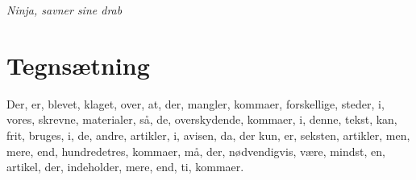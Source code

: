 \begin{minipage}[t]{100mm}
{\flushright\emph{Ninja, savner sine drab}}

\section*{Tegnsætning}
Der, er, blevet, klaget, over, at, der, mangler, kommaer, forskellige, steder, i, vores, skrevne, materialer, så, de, overskydende, kommaer, i, denne, tekst, kan, frit, bruges, i, de, andre, artikler, i, avisen, da, der kun, er, seksten, artikler, men, mere, end, hundredetres, kommaer, må, der, nødvendigvis, være, mindst, en, artikel, der, indeholder, mere, end, ti, kommaer.

\end{minipage}

